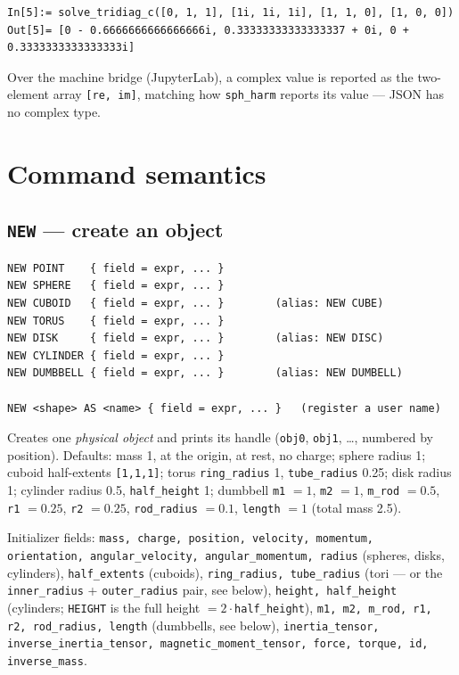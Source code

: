 \documentclass[11pt]{article}
\newcommand{\kw}[1]{\texttt{\uppercase{#1}}}
\newcommand{\code}[1]{\texttt{#1}}
\begin{document}
\begin{lstlisting}
In[5]:= solve_tridiag_c([0, 1, 1], [1i, 1i, 1i], [1, 1, 0], [1, 0, 0])
Out[5]= [0 - 0.6666666666666666i, 0.33333333333333337 + 0i, 0 + 0.3333333333333333i]
\end{lstlisting}

Over the machine bridge (JupyterLab), a complex value is reported as the
two-element array \code{[re, im]}, matching how \code{sph\_harm} reports
its value --- JSON has no complex type.

\section{Command semantics}

\subsection{\kw{new} --- create an object}\label{sec:new}

\begin{lstlisting}
NEW POINT    { field = expr, ... }
NEW SPHERE   { field = expr, ... }
NEW CUBOID   { field = expr, ... }        (alias: NEW CUBE)
NEW TORUS    { field = expr, ... }
NEW DISK     { field = expr, ... }        (alias: NEW DISC)
NEW CYLINDER { field = expr, ... }
NEW DUMBBELL { field = expr, ... }        (alias: NEW DUMBELL)

NEW <shape> AS <name> { field = expr, ... }   (register a user name)
\end{lstlisting}

Creates one \emph{physical object} and prints its handle (\code{obj0},
\code{obj1}, \ldots, numbered by position). Defaults: mass 1, at the
origin, at rest, no charge; sphere radius 1; cuboid half-extents
\code{[1,1,1]}; torus \code{ring\_radius} 1, \code{tube\_radius} 0.25;
disk radius 1; cylinder radius 0.5, \code{half\_height} 1; dumbbell
\code{m1} $= 1$, \code{m2} $= 1$, \code{m\_rod} $= 0.5$, \code{r1}
$= 0.25$, \code{r2} $= 0.25$, \code{rod\_radius} $= 0.1$,
\code{length} $= 1$ (total mass 2.5).

Initializer fields: \code{mass, charge, position, velocity, momentum,
orientation, angular\_velocity, angular\_momentum, radius} (spheres,
disks, cylinders), \code{half\_extents} (cuboids), \code{ring\_radius,
tube\_radius} (tori --- or the \code{inner\_radius} +
\code{outer\_radius} pair, see below), \code{height, half\_height}
(cylinders; \kw{height} is the full height $= 2\cdot$\code{half\_height}),
\code{m1, m2, m\_rod, r1, r2, rod\_radius, length} (dumbbells, see
below), \code{inertia\_tensor, inverse\_inertia\_tensor,
magnetic\_moment\_tensor, force, torque, id, inverse\_mass}.
\end{document}
